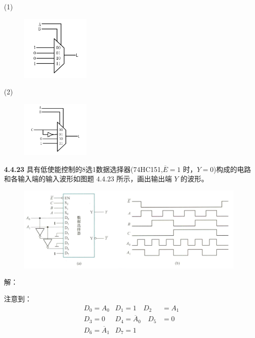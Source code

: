\documentclass[a4paper,11pt,UTF8]{article}
\begin{document}
(1)
\begin{figure}[H]
	\centering
	\includegraphics[width=0.3\textwidth]{4.4.20_1}
\end{figure}
(2)
\begin{figure}[H]
	\centering
	\includegraphics[width=0.3\textwidth]{4.4.20_2}
\end{figure}
\textbf{4.4.23} 具有低使能控制的8选1数据选择器(74HC151,$\overline{E}={1}$ 时，$Y={0}$)构成的电路和各输入端的输入波形如图题 4.4.23 所示，画出输出端 $Y$ 的波形。
\begin{figure}[H]
	\centering
	\includegraphics[width=1\textwidth]{4.4.23}
\end{figure}

解：

注意到：
$$\begin{aligned}
	&D_0=A_0  &D_1=1 \quad D_2&=A_1\\
	&D_3=0  &D_4=\overline{A}_0 \quad D_5&=0\\
	&D_6=\overline{A}_1  &D_7=1 & \\
\end{aligned}
$$
\end{document}
